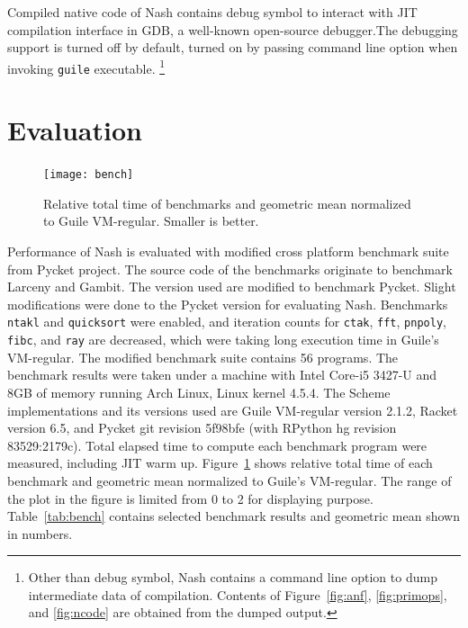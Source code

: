 \documentclass[preprint, 10pt]{sigplanconf}
\begin{document}
Compiled native code of Nash contains debug symbol to interact with JIT
compilation interface in GDB, a well-known open-source debugger.\@ The debugging
support is turned off by default, turned on by passing command line option when
invoking \texttt{guile} executable.
\footnote{Other than debug symbol, Nash contains a command line option to dump
  intermediate data of compilation. Contents of
  Figure~\hyperref[fig:anf]{\ref{fig:anf}},
  \hyperref[fig:primops]{\ref{fig:primops}}, and
  \hyperref[fig:ncode]{\ref{fig:ncode}} are obtained from the dumped output.}

\section{Evaluation}
\label{sec:evaluation}

\begin{figure}
  \centering
  \texttt{[image: bench]}
  \caption{Relative total time of benchmarks and geometric mean normalized to
    Guile VM-regular. Smaller is better.}
\label{fig:bench}
\end{figure}


Performance of Nash is evaluated with modified cross platform benchmark suite
from Pycket project. The source code of the benchmarks originate to benchmark
Larceny and Gambit. The version used are modified to benchmark Pycket. Slight
modifications were done to the Pycket version for evaluating Nash. Benchmarks
\texttt{ntakl} and \texttt{quicksort} were enabled, and iteration counts for
\texttt{ctak}, \texttt{fft}, \texttt{pnpoly}, \texttt{fibc}, and \texttt{ray}
are decreased, which were taking long execution time in Guile's VM-regular. The
modified benchmark suite contains 56 programs. The benchmark results were taken
under a machine with Intel Core-i5 3427-U and 8GB of memory running Arch Linux,
Linux kernel 4.5.4. The Scheme implementations and its versions used are Guile
VM-regular version 2.1.2, Racket version 6.5, and Pycket git revision 5f98bfe
(with RPython hg revision 83529:2179c). Total elapsed time to compute each
benchmark program were measured, including JIT warm up. Figure~\ref{fig:bench}
shows relative total time of each benchmark and geometric mean normalized to
Guile's VM-regular. The range of the plot in the figure is limited from 0 to 2
for displaying purpose. Table~\hyperref[tab:bench]{\ref{tab:bench}} contains
selected benchmark results and geometric mean shown in numbers.
\end{document}
